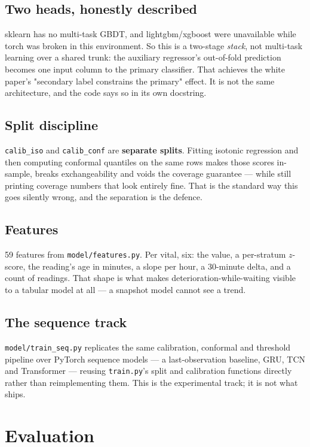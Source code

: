 \documentclass[10pt,a4paper,twocolumn]{article}
\newcommand{\pth}[1]{\textcolor{SecPurple}{\texttt{#1}}}
\newcommand{\cm}[1]{\texttt{#1}}
\begin{document}
\subsection{Two heads, honestly described}
sklearn has no multi-task GBDT, and lightgbm/xgboost were unavailable while torch was broken in
this environment. So this is a two-stage \emph{stack}, not multi-task learning over a shared trunk:
the auxiliary regressor's out-of-fold prediction becomes one input column to the primary
classifier. That achieves the white paper's "secondary label constrains the primary" effect. It is
not the same architecture, and the code says so in its own docstring.

\subsection{Split discipline}
\cm{calib\_iso} and \cm{calib\_conf} are \textbf{separate splits}. Fitting isotonic regression and
then computing conformal quantiles on the same rows makes those scores in-sample, breaks
exchangeability and voids the coverage guarantee --- while still printing coverage numbers that look
entirely fine. That is the standard way this goes silently wrong, and the separation is the defence.

\subsection{Features}
59 features from \pth{model/features.py}. Per vital, six: the value, a per-stratum $z$-score, the
reading's age in minutes, a slope per hour, a 30-minute delta, and a count of readings. That shape
is what makes deterioration-while-waiting visible to a tabular model at all --- a snapshot model
cannot see a trend.

\subsection{The sequence track}
\pth{model/train\_seq.py} replicates the same calibration, conformal and threshold pipeline over
PyTorch sequence models --- a last-observation baseline, GRU, TCN and Transformer --- reusing
\pth{train.py}'s split and calibration functions directly rather than reimplementing them. This is
the experimental track; it is not what ships.

\section{Evaluation}
\label{sec:eval}
\end{document}
